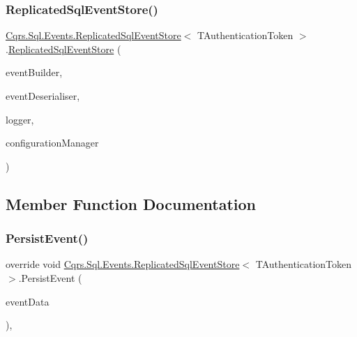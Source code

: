 \subsubsection{\texorpdfstring{Replicated\+Sql\+Event\+Store()}{ReplicatedSqlEventStore()}}
{\footnotesize\ttfamily \hyperlink{classCqrs_1_1Sql_1_1Events_1_1ReplicatedSqlEventStore}{Cqrs.\+Sql.\+Events.\+Replicated\+Sql\+Event\+Store}$<$ T\+Authentication\+Token $>$.\hyperlink{classCqrs_1_1Sql_1_1Events_1_1ReplicatedSqlEventStore}{Replicated\+Sql\+Event\+Store} (\begin{DoxyParamCaption}\item[{\hyperlink{interfaceCqrs_1_1Events_1_1IEventBuilder}{I\+Event\+Builder}$<$ T\+Authentication\+Token $>$}]{event\+Builder,  }\item[{\hyperlink{interfaceCqrs_1_1Events_1_1IEventDeserialiser}{I\+Event\+Deserialiser}$<$ T\+Authentication\+Token $>$}]{event\+Deserialiser,  }\item[{I\+Logger}]{logger,  }\item[{\hyperlink{interfaceCqrs_1_1Configuration_1_1IConfigurationManager}{I\+Configuration\+Manager}}]{configuration\+Manager }\end{DoxyParamCaption})}



\subsection{Member Function Documentation}
\mbox{\label{classCqrs_1_1Sql_1_1Events_1_1ReplicatedSqlEventStore_a51c9b1329327e456a251aa2d910fc7ae_a51c9b1329327e456a251aa2d910fc7ae}} 
\subsubsection{\texorpdfstring{Persist\+Event()}{PersistEvent()}}
{\footnotesize\ttfamily override void \hyperlink{classCqrs_1_1Sql_1_1Events_1_1ReplicatedSqlEventStore}{Cqrs.\+Sql.\+Events.\+Replicated\+Sql\+Event\+Store}$<$ T\+Authentication\+Token $>$.Persist\+Event (\begin{DoxyParamCaption}\item[{\hyperlink{classCqrs_1_1Events_1_1EventData}{Event\+Data}}]{event\+Data }\end{DoxyParamCaption})\hspace{0.3cm}{\ttfamily [protected]}, {\ttfamily [virtual]}}



